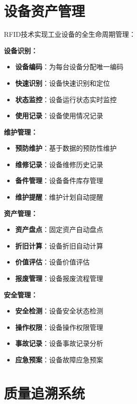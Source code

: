 \documentclass[12pt,UTF8]{ctexbook}
\begin{document}
\begin{itemize}[leftmargin=3.5em]
\begin{itemize}[leftmargin=3.5em]
\begin{itemize}[leftmargin=3.5em]
\begin{itemize}[leftmargin=3.5em]
\section{设备资产管理}

RFID技术实现工业设备的全生命周期管理：

\textbf{设备识别：}
\begin{itemize}[leftmargin=3.5em]
    \item \textbf{设备编码}：为每台设备分配唯一编码
    \item \textbf{快速识别}：设备快速识别和定位
    \item \textbf{状态监控}：设备运行状态实时监控
    \item \textbf{使用记录}：设备使用情况记录
\end{itemize}

\textbf{维护管理：}
\begin{itemize}[leftmargin=3.5em]
    \item \textbf{预防维护}：基于数据的预防性维护
    \item \textbf{维修记录}：设备维修历史记录
    \item \textbf{备件管理}：设备备件库存管理
    \item \textbf{维护提醒}：维护计划自动提醒
\end{itemize}

\textbf{资产管理：}
\begin{itemize}[leftmargin=3.5em]
    \item \textbf{资产盘点}：固定资产自动盘点
    \item \textbf{折旧计算}：设备折旧自动计算
    \item \textbf{价值评估}：设备价值评估
    \item \textbf{报废管理}：设备报废流程管理
\end{itemize}

\textbf{安全管理：}
\begin{itemize}[leftmargin=3.5em]
    \item \textbf{安全检测}：设备安全状态检测
    \item \textbf{操作权限}：设备操作权限管理
    \item \textbf{事故记录}：设备事故记录分析
    \item \textbf{应急预案}：设备故障应急预案
\end{itemize}

\section{质量追溯系统}


\end{itemize}
\end{itemize}
\end{itemize}
\end{itemize}
\end{document}
